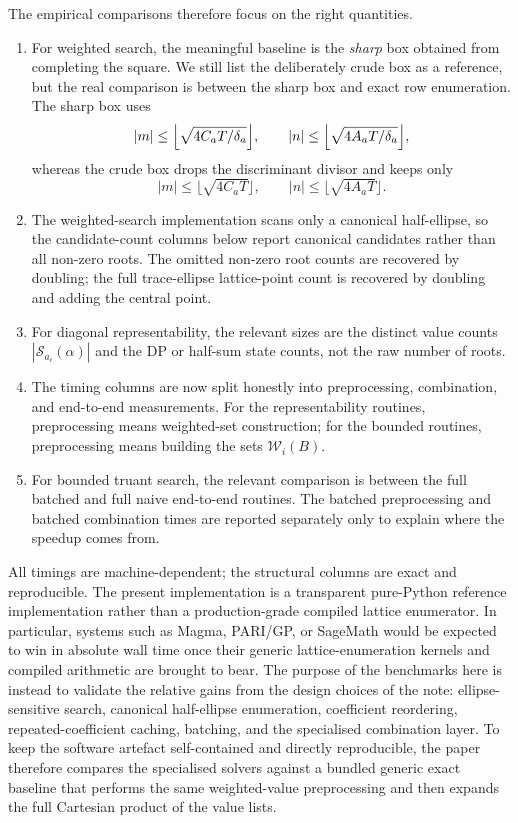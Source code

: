 \documentclass[manuscript]{acmart}
\theoremstyle{plain}
\theoremstyle{definition}
\theoremstyle{nonitalicremark}
\newcommand{\cS}{\mathcal{S}}
\newcommand{\cW}{\mathcal{W}}
\begin{document}
The empirical comparisons therefore focus on the right quantities.
\begin{enumerate}[label=\textup{(\roman*)},itemsep=0.2em]
\item For weighted search, the meaningful baseline is the \emph{sharp} box obtained from completing
      the square. We still list the deliberately crude box as a reference, but the real comparison is
      between the sharp box and exact row enumeration. The sharp box uses
      \[
      |m|\le \Bigl\lfloor\sqrt{4C_aT/\delta_a}\Bigr\rfloor,
      \qquad
      |n|\le \Bigl\lfloor\sqrt{4A_aT/\delta_a}\Bigr\rfloor,
      \]
      whereas the crude box drops the discriminant divisor and keeps only
      \[
      |m|\le \lfloor\sqrt{4C_aT}\rfloor,
      \qquad
      |n|\le \lfloor\sqrt{4A_aT}\rfloor.
      \]
\item The weighted-search implementation scans only a canonical half-ellipse, so the candidate-count
      columns below report canonical candidates rather than all non-zero roots. The omitted non-zero root
      counts are recovered by doubling; the full trace-ellipse lattice-point count is recovered by
      doubling and adding the central point.
\item For diagonal representability, the relevant sizes are the distinct value counts
      $|\cS_{a_i}(\alpha)|$ and the DP or half-sum state counts, not the raw number of roots.
\item The timing columns are now split honestly into preprocessing, combination, and end-to-end
      measurements. For the representability routines, preprocessing means weighted-set construction;
      for the bounded routines, preprocessing means building the sets $\cW_i(B)$.
\item For bounded truant search, the relevant comparison is between the full batched and full
      naive end-to-end routines. The batched preprocessing and batched combination times are reported
      separately only to explain where the speedup comes from.
\end{enumerate}
All timings are machine-dependent; the structural columns are exact and reproducible. The present
implementation is a transparent pure-Python reference implementation rather than a production-grade
compiled lattice enumerator. In particular, systems such as Magma, PARI/GP, or SageMath would be
expected to win in absolute wall time once their generic lattice-enumeration kernels and compiled
arithmetic are brought to bear. The purpose of the benchmarks here is instead to validate the
relative gains from the design choices of the note: ellipse-sensitive search, canonical half-ellipse
enumeration, coefficient reordering, repeated-coefficient caching, batching, and the specialised
combination layer. To keep the software artefact self-contained and directly reproducible, the paper
therefore compares the specialised solvers against a bundled generic exact baseline that performs the
same weighted-value preprocessing and then expands the full Cartesian product of the value lists.
\end{document}
